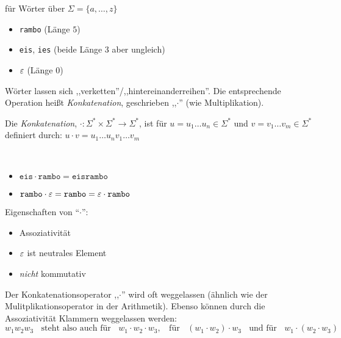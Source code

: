 \goodbreak

\begin{Bsp*} für Wörter über $\Sigma=\{a,\dots,z\}$
  \begin{itemize}
  \item \verb/rambo/ (Länge $5$)
  \item \verb/eis/, \verb/ies/ (beide Länge 3 aber ungleich) 
  \item $\varepsilon$ (Länge $0$)
  \end{itemize}
\end{Bsp*}
Wörter lassen sich ,,verketten''/,,hintereinanderreihen''.
Die entsprechende Operation heißt \emph{Konkatenation}, geschrieben ,,$\cdot$'' (wie Multiplikation).
\begin{Def}
  Die \emph{Konkatenation}, $\mathord{\cdot} : \Sigma^* \times \Sigma^* \to \Sigma^*$, ist für $u=u_1\ldots u_n\in\Sigma^*$ und $v=v_1\ldots v_m\in\Sigma^*$ definiert durch:
  $u\cdot v = u_1\ldots u_nv_1\ldots v_m$
\end{Def}
\begin{Bsp*} ~
  \begin{itemize}
  \item $\mathtt{eis}\cdot\mathtt{rambo} =\mathtt{eisrambo}$
  \item $\mathtt{rambo} \cdot \varepsilon = \mathtt{rambo} = \varepsilon \cdot \mathtt{rambo}$ 
  \end{itemize}
\end{Bsp*}
Eigenschaften von "`$\cdot$"':
\begin{itemize}
\item Assoziativität
\item $\varepsilon$ ist neutrales Element
\item \emph{nicht} kommutativ
\end{itemize}


Der Konkatenationsoperator ,,$\cdot$'' wird oft weggelassen (ähnlich wie der Mulitplikationsoperator in der Arithmetik).
Ebenso können durch die Assoziativität Klammern weggelassen werden:
\begin{displaymath}
  w_1w_2w_3 \;\; \text{ steht also auch für } \;\; w_1\cdot w_2\cdot w_3,\;\;\text{ für }\;\;  (w_1 \cdot w_2) \cdot w_3 \;\;\text{ und für }\;\; w_1 \cdot (w_2 \cdot w_3)
\end{displaymath}

